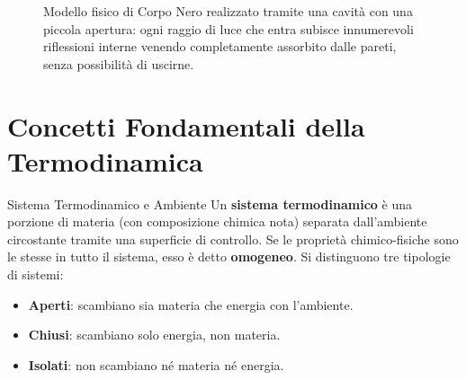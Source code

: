 \begin{figure}[ht]
\centering
{}
\caption{Modello fisico di Corpo Nero realizzato tramite una cavità con una piccola apertura: ogni raggio di luce che entra subisce innumerevoli riflessioni interne venendo completamente assorbito dalle pareti, senza possibilità di uscirne.}
\end{figure}

\section{Concetti Fondamentali della Termodinamica}

\begin{definizione}{Sistema Termodinamico e Ambiente}
Un \textbf{sistema termodinamico} è una porzione di materia (con composizione chimica nota) separata dall'ambiente circostante tramite una superficie di controllo. 
Se le proprietà chimico-fisiche sono le stesse in tutto il sistema, esso è detto \textbf{omogeneo}. 
Si distinguono tre tipologie di sistemi:
\begin{itemize}
    \item \textbf{Aperti}: scambiano sia materia che energia con l'ambiente.
    \item \textbf{Chiusi}: scambiano solo energia, non materia.
    \item \textbf{Isolati}: non scambiano né materia né energia.
\end{itemize}
\end{definizione}

